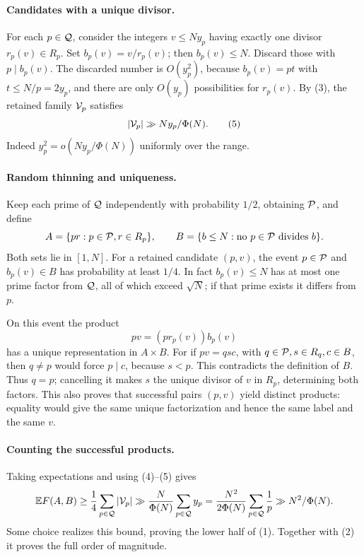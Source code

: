 \paragraph{Candidates with a unique divisor.}
For each \(p\in{\cal Q}\), consider the integers \(v\leq Ny_p\)
having exactly one divisor \(r_p(v)\in R_p\).
Set \(b_p(v)=v/r_p(v)\); then \(b_p(v)\leq N\).
Discard those with \(p\mid b_p(v)\).
The discarded number is \(O(y_p^2)\), because
\(b_p(v)=pt\) with \(t\leq N/p=2y_p\), and there are
only \(O(y_p)\) possibilities for \(r_p(v)\).
By (3), the retained family \({\cal V}_p\) satisfies
\[
 |{\cal V}_p|\gg Ny_p/\Phi(N).
\tag{5}
\]
Indeed \(y_p^2=o(Ny_p/\Phi(N))\) uniformly over the range.

\paragraph{Random thinning and uniqueness.}
Keep each prime of \({\cal Q}\) independently with
probability \(1/2\), obtaining \({\cal P}\), and define
\[
 A=\{pr:p\in{\cal P},r\in R_p\},\qquad
 B=\{b\leq N:\text{no }p\in{\cal P}\text{ divides }b\}.
\]
Both sets lie in \([1,N]\).
For a retained candidate \((p,v)\), the event
\(p\in{\cal P}\) and \(b_p(v)\in B\) has probability
at least \(1/4\). In fact \(b_p(v)\leq N\) has at most
one prime factor from \({\cal Q}\), all of which exceed
\(\sqrt N\); if that prime exists it differs from \(p\).

On this event the product
\[
 pv=(p r_p(v))b_p(v)
\]
has a unique representation in \(A\times B\).
For if \(pv=qsc\), with \(q\in{\cal P},s\in R_q,c\in B\),
then \(q\ne p\) would force \(p\mid c\), because \(s<p\).
This contradicts the definition of \(B\).
Thus \(q=p\); cancelling it makes \(s\) the unique divisor
of \(v\) in \(R_p\), determining both factors.
This also proves that successful pairs \((p,v)\) yield
distinct products: equality would give the same unique
factorization and hence the same label and the same \(v\).

\paragraph{Counting the successful products.}
Taking expectations and using (4)--(5) gives
\[
 \mathbb E F(A,B)
 \geq\frac14\sum_{p\in{\cal Q}}|{\cal V}_p|
 \gg\frac{N}{\Phi(N)}\sum_{p\in{\cal Q}}y_p
 =\frac{N^2}{2\Phi(N)}
       \sum_{p\in{\cal Q}}\frac1p
 \gg N^2/\Phi(N).
\]
Some choice realizes this bound, proving the lower half
of (1). Together with (2) it proves the full order of magnitude.

